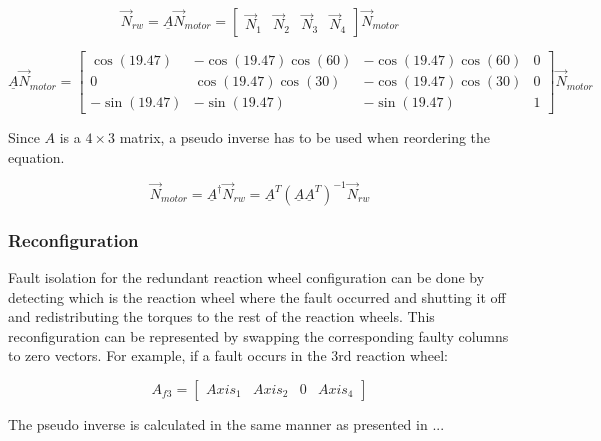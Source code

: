 \cite{reactionWheelConfigThesis}

\begin{equation}
\vec{N}_{rw} = \underline{A} \vec{N}_{motor} = \begin{bmatrix}
\vec{N}_{1}       & \vec{N}_{2}  & \vec{N}_{3}  & \vec{N}_{4} 
\end{bmatrix} \vec{N}_{motor}
\end{equation}

\begin{equation}
\underline{A} \vec{N}_{motor}  = 
\begin{bmatrix}
\cos(19.47)       & -\cos(19.47) \cos(60)  &  -\cos(19.47) \cos(60)  & 0 \\
0       & \cos(19.47) \cos(30)  &  -\cos(19.47) \cos(30)  & 0 \\
-\sin(19.47)       & -\sin(19.47)   &  -\sin(19.47)   & 1
\end{bmatrix} \vec{N}_{motor}
\end{equation}

Since $A$ is a $ 4 \times 3 $ matrix, a pseudo inverse has to be used when reordering the equation.

\begin{equation}
\vec{N}_{motor} = \underline{A} ^\dagger \vec{N}_{rw}   =  \underline{A}^T  (\underline{A} \underline{A} ^T)^{-1}\vec{N}_{rw}
\end{equation}


\cite[equation 18.41-42]{SADC}
\cite{reactionWheelConfigThesis}




\subsubsection{Reconfiguration}

Fault isolation for the redundant reaction wheel configuration can be done by detecting which is the reaction wheel where the fault occurred and shutting it off and redistributing the torques to the rest of the reaction wheels. This reconfiguration can be represented by swapping the corresponding faulty columns to zero vectors. For example, if a fault occurs in the 3rd reaction wheel:

\begin{equation}
A_{f3} = \begin{bmatrix}
Axis_{1}       & Axis_{2}  & 0  & Axis_{4} 
\end{bmatrix}
\end{equation}

The pseudo inverse is calculated in the same manner as presented in ... 



